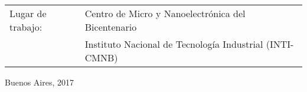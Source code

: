 \begin{titlepage}
		\noindent\begin{tabular}{@{}ll}
		Lugar de trabajo: &Centro de Micro y Nanoelectrónica del Bicentenario \\
						  & Instituto Nacional de Tecnología Industrial (INTI-CMNB) \\ 
		\end{tabular} 
		\setlength\tabcolsep{6pt}

		\vspace*{\fill}
		\begin{center}
		\small{Buenos Aires, 2017}
	 	\end{center}


\end{titlepage}